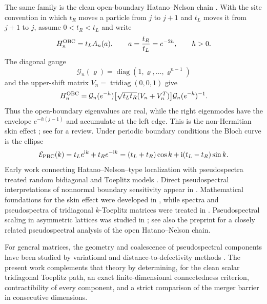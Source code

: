 \documentclass[review,hidelinks,onefignum,onetabnum]{siamart251216}
\DeclareMathOperator{\diag}{diag}
\DeclareMathOperator{\tridiag}{tridiag}
\newcommand{\ii}{\mathrm i}
\begin{document}
The same family is the clean open-boundary Hatano--Nelson chain
\cite{HatanoNelson1996,HatanoNelson1997}.  With the site convention in
which $t_R$ moves a particle from $j$ to $j+1$ and $t_L$ moves it from
$j+1$ to $j$, assume $0<t_R<t_L$ and write
\begin{equation}\label{eq:physical-scaling}
 H_n^{\rm OBC}=t_LA_n(a),\qquad
 a=\frac{t_R}{t_L}=e^{-2h},\qquad h>0.
\end{equation}
The diagonal gauge
\[
 \mathcal G_n(\varrho)=\diag(1,\varrho,\ldots,\varrho^{n-1})
\]
and the upper-shift matrix \(V_n=\tridiag(0,0,1)\) give
\begin{equation}\label{eq:imaginary-gauge}
 H_n^{\rm OBC}
 =\mathcal G_n(e^{-h})
 \bigl[\sqrt{t_Lt_R}(V_n+V_n^T)\bigr]
 \mathcal G_n(e^{-h})^{-1}.
\end{equation}
Thus the open-boundary eigenvalues are real, while the right eigenmodes
have the envelope $e^{-h(j-1)}$ and accumulate at the left edge.  This
is the non-Hermitian skin effect
\cite{OkumaEtAl2020,YaoWang2018,YokomizoMurakami2019}; see
\cite{ZhangEtAl2022} for a review.  Under periodic boundary conditions
the Bloch curve is the ellipse
\begin{equation}\label{eq:pbc-symbol-intro}
 \mathcal E_{\rm PBC}(k)=t_Le^{\ii k}+t_Re^{-\ii k}
 =(t_L+t_R)\cos k+\ii(t_L-t_R)\sin k.
\end{equation}
Early work connecting Hatano--Nelson--type localization with
pseudospectra treated random bidiagonal and Toeplitz models
\cite{TrefethenContediniEmbree2001}.  Direct pseudospectral
interpretations of nonnormal boundary sensitivity appear in
\cite{OkumaSato2020,OkumaSato2021}.  Mathematical foundations for the
skin effect were developed in \cite{AmmariEtAl2024}, while spectra and
pseudospectra of tridiagonal $k$-Toeplitz matrices were treated in
\cite{AmmariEtAl2025,AmmariCorrigendum2026}.  Pseudospectral scaling in
asymmetric lattices was studied in \cite{KiorpelidisMakris2025}; see
also the preprint \cite{Sirker2026} for a closely related
pseudospectral analysis of the open Hatano--Nelson chain.

For general matrices, the geometry and coalescence of pseudospectral
components have been studied by variational and distance-to-defectivity
methods \cite{AlamEtAl2011,BurkeLewisOverton2003,LewisPang2008}.  The
present work complements that theory by determining, for the clean
scalar tridiagonal Toeplitz path, an exact finite-dimensional
connectedness criterion, contractibility of every component, and a
strict comparison of the merger barrier in consecutive dimensions.
\end{document}
